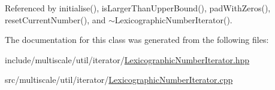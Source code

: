 Referenced by initialise(), is\-Larger\-Than\-Upper\-Bound(), pad\-With\-Zeros(), reset\-Current\-Number(), and $\sim$\-Lexicographic\-Number\-Iterator().



The documentation for this class was generated from the following files\-:\begin{DoxyCompactItemize}
\item 
include/multiscale/util/iterator/\hyperlink{LexicographicNumberIterator_8hpp}{Lexicographic\-Number\-Iterator.\-hpp}\item 
src/multiscale/util/iterator/\hyperlink{LexicographicNumberIterator_8cpp}{Lexicographic\-Number\-Iterator.\-cpp}\end{DoxyCompactItemize}
